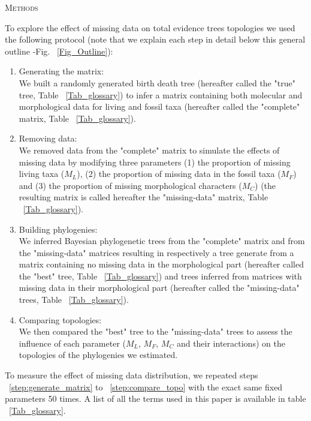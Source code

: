 \documentclass[12pt,letterpaper]{article}
\renewcommand{\section}[1]{%
\bigskip
\begin{center}
\begin{Large}
\normalfont\scshape #1
\medskip
\end{Large}
\end{center}}
\begin{document}

\section{Methods} %
To explore the effect of missing data on total evidence trees topologies we used the following protocol (note that we explain each step in detail below this general outline -Fig. ~\ref{Fig_Outline}):
\begin{enumerate}
\item{Generating the matrix:} \\
\label{step:generate_matrix}
We built a randomly generated birth death tree (hereafter called the "true" tree, Table ~\ref{Tab_glossary}) to infer a matrix containing both molecular and morphological data for living and fossil taxa (hereafter called the "complete" matrix, Table ~\ref{Tab_glossary}).
\item{Removing data:} \\
\label{step:remove_data}
We removed data from the "complete" matrix to simulate the effects of missing data by modifying three parameters (1) the proportion of missing living taxa ($M_{L}$), (2) the proportion of missing data in the fossil taxa ($M_{F}$) and (3) the proportion of missing morphological characters ($M_{C}$) (the resulting matrix is called hereafter the "missing-data" matrix, Table ~\ref{Tab_glossary}).
\item{Building phylogenies:} \\
\label{step:build_phylo}
We inferred Bayesian phylogenetic trees from the "complete" matrix and from the "missing-data" matrices resulting in respectively a tree generate from a matrix containing no missing data in the morphological part (hereafter called the "best" tree, Table ~\ref{Tab_glossary}) and trees inferred from matrices with missing data in their morphological part (hereafter called the "missing-data" trees, Table ~\ref{Tab_glossary}).
\item{Comparing topologies:} \\
\label{step:compare_topo}
We then compared the "best" tree to the "missing-data" trees to assess the influence of each parameter ($M_{L}$, $M_{F}$, $M_{C}$ and their interactions) on the topologies of the phylogenies we estimated.
\end{enumerate}
To measure the effect of missing data distribution, we repeated steps ~\ref{step:generate_matrix} to ~\ref{step:compare_topo} with the exact same fixed parameters 50 times. A list of all the terms used in this paper is available in table ~\ref{Tab_glossary}.
\end{document}
